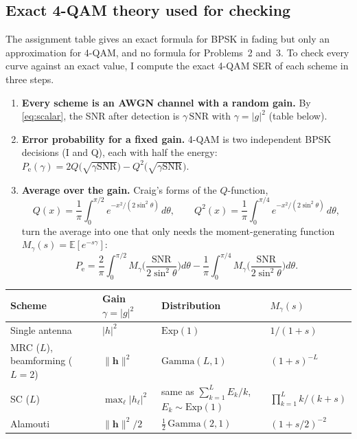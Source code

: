 \documentclass[11pt,a4paper]{article}
\newcommand{\snr}{\mathrm{SNR}}
\newcommand{\E}{\mathbb{E}}
\newcommand{\norm}[1]{\lVert #1 \rVert}
\newcommand{\abs}[1]{\lvert #1 \rvert}
\newcommand{\Pe}{P_{\mathrm{e}}}
\newcommand{\h}{\mathbf{h}}
\begin{document}
\subsection{Exact 4-QAM theory used for checking}
\label{sec:exact}

The assignment table gives an exact formula for BPSK in fading but only an
approximation for 4-QAM, and no formula for Problems~2 and~3. To check every
curve against an exact value, I compute the exact 4-QAM SER of each scheme in
three steps.
\begin{enumerate}
  \item \textbf{Every scheme is an AWGN channel with a random gain.} By
        \eqref{eq:scalar}, the SNR after detection is $\gamma\,\snr$ with
        $\gamma = \abs{g}^2$ (table below).
  \item \textbf{Error probability for a fixed gain.} 4-QAM is two independent BPSK
        decisions (I and Q), each with half the energy:
        $\Pe(\gamma) = 2Q\big(\sqrt{\gamma\snr}\big) - Q^2\big(\sqrt{\gamma\snr}\big)$.
  \item \textbf{Average over the gain.} Craig's forms of the $Q$-function,
        \begin{equation*}
          Q(x) = \frac1\pi\int_0^{\pi/2} e^{-x^2/(2\sin^2\theta)}\,d\theta, \qquad
          Q^2(x) = \frac1\pi\int_0^{\pi/4} e^{-x^2/(2\sin^2\theta)}\,d\theta,
        \end{equation*}
        turn the average into one that only needs the moment-generating function
        $M_\gamma(s) = \E[e^{-s\gamma}]$:
        \begin{equation}
          \Pe = \frac{2}{\pi}\int_0^{\pi/2} M_\gamma\Big(\frac{\snr}{2\sin^2\theta}\Big)d\theta
              - \frac{1}{\pi}\int_0^{\pi/4} M_\gamma\Big(\frac{\snr}{2\sin^2\theta}\Big)d\theta .
          \label{eq:craig}
        \end{equation}
\end{enumerate}

\begin{center}\small
  \begin{tabular}{@{}llll@{}}
    \toprule
    Scheme & Gain $\gamma = \abs{g}^2$ & Distribution & $M_\gamma(s)$ \\
    \midrule
    Single antenna        & $\abs{h}^2$                   & $\mathrm{Exp}(1)$     & $1/(1+s)$ \\
    MRC ($L$), beamforming ($L=2$) & $\norm{\h}^2$        & $\mathrm{Gamma}(L,1)$ & $(1+s)^{-L}$ \\
    SC ($L$)              & $\max_\ell\abs{h_\ell}^2$     & same as $\sum_{k=1}^{L} E_k/k$, $E_k \sim \mathrm{Exp}(1)$ & $\prod_{k=1}^{L} k/(k+s)$ \\
    Alamouti              & $\norm{\h}^2/2$               & $\tfrac12\,\mathrm{Gamma}(2,1)$ & $(1+s/2)^{-2}$ \\
    \bottomrule
  \end{tabular}
\end{center}
\end{document}
